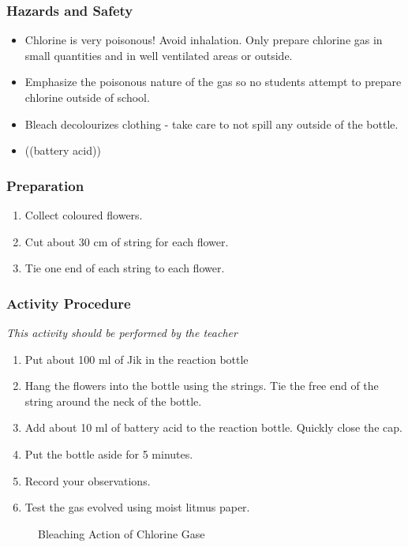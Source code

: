 \subsubsection*{Hazards and Safety}
\begin{itemize}
\item{Chlorine is very poisonous! Avoid inhalation. Only prepare chlorine gas in small quantities and in well ventilated areas or outside.}
\item{Emphasize the poisonous nature of the gas so no students attempt to prepare chlorine outside of school.}
\item{Bleach decolourizes clothing - take care to not spill any outside of the bottle.}
\item{((battery acid))}
\end{itemize}

\subsubsection*{Preparation}
\begin{enumerate}
\item{Collect coloured flowers.}
\item{Cut about 30 cm of string for each flower.}
\item{Tie one end of each string to each flower.}
\end{enumerate}

\subsubsection*{Activity Procedure}
\textit{This activity should be performed by the teacher}
\begin{enumerate}
\item{Put about 100 ml of Jik in the reaction bottle}
\item{Hang the flowers into the bottle using the strings. Tie the free end of the string around the neck of the bottle.}
\item{Add about 10 ml of battery acid to the reaction bottle. Quickly close the cap.}
\item{Put the bottle aside for 5 minutes.}
\item{Record your observations.}
\item{Test the gas evolved using moist litmus paper.}
\end{enumerate}

\begin{figure}[h]
\begin{center}
\def\svgwidth{170pt}

\caption{Bleaching Action of Chlorine Gase}
\end{center}
\end{figure}

